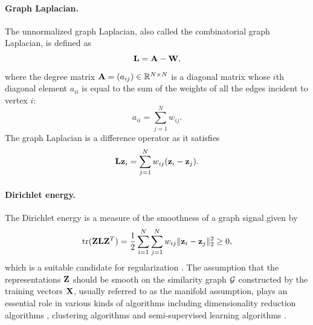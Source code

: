 \paragraph{Graph Laplacian.}
The unnormalized graph Laplacian, also called the combinatorial graph Laplacian, is defined as
\begin{equation}
	\mathbf{L} = \mathbf{A} - \mathbf{W},
\end{equation}
where the degree matrix $\mathbf{A}=(a_{ij}) \in \mathbb{R}^{N \times N}$ is a diagonal matrix whose $i$th diagonal element $a_{ii}$ is equal to the sum of the weights of all the edges incident to vertex $i$:
\begin{equation}
	a_{ii} = \sum\limits_{j=1}^{N} w_{ij}.
\end{equation}
The graph Laplacian is a difference operator as it satisfies
\begin{equation}
	\mathbf{L}\mathbf{z}_i = \sum\limits_{j=1}^{N} w_{ij} (\mathbf{z}_i - \mathbf{z}_j).
\end{equation}

\paragraph{Dirichlet energy.}
The Dirichlet energy is a measure of the smoothness of a graph signal given by
\begin{equation} \label{eqn:dirichlet_energy}
	\operatorname*{tr}(\mathbf{Z}\mathbf{L}\mathbf{Z}^T) = \frac{1}{2} \sum\limits_{i=1}^{N} \sum\limits_{j=1}^{N} w_{ij} \| \mathbf{z}_i - \mathbf{z}_j \|_2^2 \geq 0,
\end{equation}
which is a suitable candidate for regularization \cite{belkin2006manifoldRegularization}.
The assumption that the representations $\mathbf{Z}$ should be smooth on the similarity graph $\mathcal{G}$ constructed by the training vectors $\mathbf{X}$, usually referred to as the manifold assumption, plays an essential role in various kinds of algorithms including dimensionality reduction algorithms \cite{belkin2001laplacianEigenmaps}, clustering algorithms \cite{ng2002spectralClustering} and semi-supervised learning algorithms \cite{belkin2006manifoldRegularization, zhou2004manifoldRegularization}.

